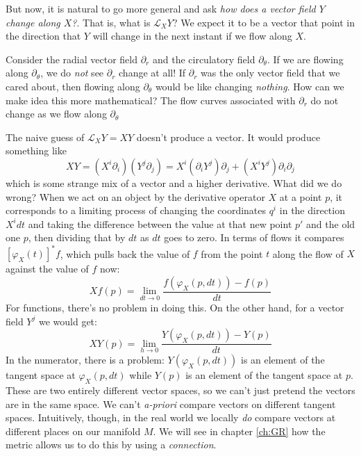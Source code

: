 		
		But now, it is natural to go more general and ask \emph{how does a vector field $Y$ change along $X$?}. That is, what is $\mathcal L_X Y$? We expect it to be a vector that point in the direction that $Y$ will change in the next instant if we flow along $X$. 
		
		Consider the radial vector field $\partial_r$ and the circulatory field $\partial_\theta$. If we are flowing along $\partial_\theta$, we do \emph{not} see $\partial_r$ change at all! If $\partial_r$ was the only vector field that we cared about, then flowing along $\partial_\theta$ would be like changing \emph{nothing}. How can we make idea this more mathematical? The flow curves associated with $\partial_r$ do not change as we flow along $\partial_\theta$
		
		
		The naive guess of $\mathcal L_X Y = XY$ doesn't produce a vector. It would produce something like 
		\begin{equation}
			XY = (X^i \partial_i) (Y^j \partial_j) = X^i (\partial_i Y^j) \partial_j + (X^i Y^j) \partial_i \partial_j
		\end{equation}
		which is some strange mix of a vector and a higher derivative. What did we do wrong? When we act on an object by the derivative operator $X$ at a point $p$, it corresponds to a limiting process of changing the coordinates $q^i$ in the direction $X^i dt$ and taking the difference between the value at that new point $p'$ and the old one $p$, then dividing that by $dt$ as $dt$ goes to zero. In terms of flows it compares $[\varphi_X(t)]^* f$, which pulls back the value of $f$ from the point $t$ along the flow of $X$ against the value of $f$ now: 
		\begin{equation}
			Xf(p) = \lim_{dt \rightarrow 0} \frac{f(\varphi_X (p,dt)) - f(p)}{dt}
		\end{equation}
		For functions, there's no problem in doing this. On the other hand, for a vector field $Y^j$ we would get:
		\begin{equation}
			XY(p) = \lim_{h \rightarrow 0} \frac{Y(\varphi_X (p,dt)) - Y(p)}{dt}
		\end{equation}
		In the numerator, there is a problem: $Y(\varphi_X (p,dt))$ is an element of the tangent space at $\varphi_X (p,dt)$ while $Y(p)$ is an element of the tangent space at $p$. These are two entirely different vector spaces, so we can't just pretend the vectors are in the same space. We can't \emph{a-priori} compare vectors on different tangent spaces. Intuitively, though, in the real world we locally \emph{do} compare vectors at different places on our manifold $M$. We will see in chapter \ref{ch:GR} how the metric allows us to do this by using a \emph{connection}.  
		
